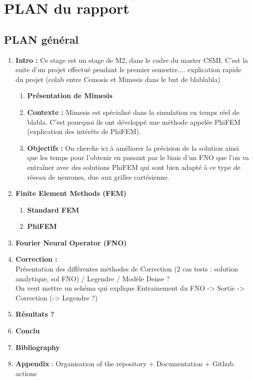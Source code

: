 \documentclass[12pt]{article}
\begin{document}
	\nocite{*}
	
	
	\tableofcontents
	
	\newpage
	
	\section{PLAN du rapport}
	
	\subsection{PLAN général}
	
	\begin{enumerate}
		\item \textbf{Intro :} Ce stage est un stage de M2, dans le cadre du master CSMI. C'est la suite d'un projet effectué pendant le premier semestre.... explication rapide du projet (colab entre Cemosis et Mimesis dans le but de blablabla)
		\begin{enumerate}
			\item \textbf{Présentation de Mimesis}
			\item \textbf{Contexte : }Mimesis est spécialisé dans la simulation en temps réel de blabla. C'est pourquoi ils ont développé une méthode appelée PhiFEM (explication des intérêts de PhiFEM).
			\item \textbf{Objectifs :} On cherche ici à améliorer la précision de la solution ainsi que les temps pour l'obtenir en passant par le biais d'un FNO que l'on va entraîner avec des solutions PhiFEM qui sont bien adapté à ce type de réseau de neurones, due aux grilles cartésienne.
		\end{enumerate}
		\item \textbf{Finite Element Methods (FEM)}
		\begin{enumerate}
			\item \textbf{Standard FEM}
			\item \textbf{PhiFEM}
		\end{enumerate}
		\item \textbf{Fourier Neural Operator (FNO)}
		\item \textbf{Correction :} \\
		Présentation des différentes méthodes de Correction (2 cas tests : solution analytique, sol FNO) / Legendre / Modèle Dense ?  \\
		On veut mettre un schéma qui explique Entrainement du FNO -> Sortie -> Correction (-> Legendre ?)
		\item \textbf{Résultats ?}
		\item \textbf{Conclu}
		\item \textbf{Bibliography}
		\item \textbf{Appendix} : Organisation of the repository +  Documentation + Github actions
	\end{enumerate}
\end{document}
